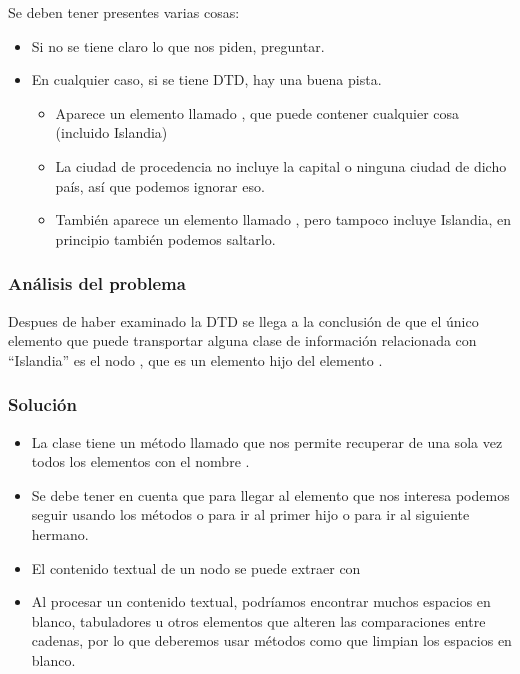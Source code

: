 \documentclass[letterpaper,10pt,spanish]{sphinxmanual}
\begin{document}
Se deben tener presentes varias cosas:
\begin{itemize}
\item {} 
Si no se tiene claro lo que nos piden, preguntar.

\item {} 
En cualquier caso, si se tiene DTD, hay una buena pista.
\begin{itemize}
\item {} 
Aparece un elemento llamado , que puede contener cualquier cosa (incluido Islandia)

\item {} 
La ciudad de procedencia no incluye la capital o ninguna ciudad de dicho país, así que podemos ignorar eso.

\item {} 
También aparece un elemento llamado , pero tampoco incluye Islandia, en principio también podemos saltarlo.

\end{itemize}

\end{itemize}


\subsubsection{Análisis del problema}
\label{tema6:analisis-del-problema}
Despues de haber examinado la DTD se llega a la conclusión de que el único elemento que puede transportar alguna clase de información relacionada con ``Islandia'' es el nodo , que es un elemento hijo del elemento .


\subsubsection{Solución}
\label{tema6:solucion}\begin{itemize}
\item {} 
La clase  tiene un método llamado  que nos permite recuperar de una sola vez todos los elementos con el nombre .

\item {} 
Se debe tener en cuenta que para llegar al elemento que nos interesa podemos seguir usando los métodos  o  para ir al primer hijo o para ir al siguiente hermano.

\item {} 
El contenido textual de un nodo se puede extraer con 

\item {} 
Al procesar un contenido textual, podríamos encontrar muchos espacios en blanco, tabuladores u otros elementos que alteren las comparaciones entre cadenas, por lo que deberemos usar métodos como  que limpian los espacios en blanco.

\end{itemize}
\end{document}
